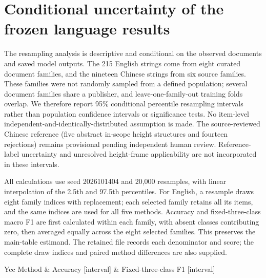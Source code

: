 \section{Conditional uncertainty of the frozen language results}
\label{sec:conditional-uncertainty}
The resampling analysis is descriptive and conditional on the observed documents and saved model outputs. The 215 English strings come from eight curated document families, and the nineteen Chinese strings from six source families. These families were not randomly sampled from a defined population; several document families share a publisher, and leave-one-family-out training folds overlap. We therefore report 95\% conditional percentile resampling intervals rather than population confidence intervals or significance tests. No item-level independent-and-identically-distributed assumption is made. The source-reviewed Chinese reference (five abstract in-scope height structures and fourteen rejections) remains provisional pending independent human review. Reference-label uncertainty and unresolved height-frame applicability are not incorporated in these intervals.

All calculations use seed 2026101404 and 20,000 resamples, with linear interpolation of the 2.5th and 97.5th percentiles. For English, a resample draws eight family indices with replacement; each selected family retains all its items, and the same indices are used for all five methods. Accuracy and fixed-three-class macro F1 are first calculated within each family, with absent classes contributing zero, then averaged equally across the eight selected families. This preserves the main-table estimand. The retained file  records each denominator and score; the complete draw indices and paired method differences are also supplied.

\begin{table}[htbp]
\caption{English equal-family scores with 95\% conditional source-family resampling intervals. Each method uses the same 215 strings and eight families. Brackets describe empirical family reweighting and do not define population confidence limits.}
\label{tab:english-conditional-intervals}
\centering\footnotesize
\begin{tabularx}{\textwidth}{Ycc}
\toprule
Method & Accuracy [interval] & Fixed-three-class F1 [interval] \\
\midrule

\bottomrule
\end{tabularx}
\end{table}


